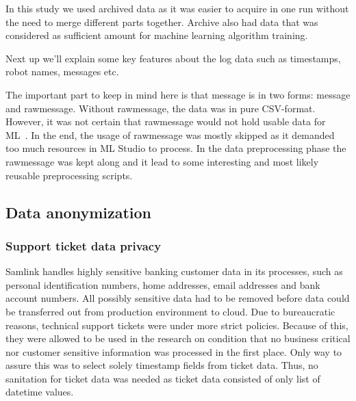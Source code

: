 In this study we used archived data
as it was easier to acquire in one run
without the need to merge different parts together.
Archive also had
data that was considered as sufficient amount
for machine learning algorithm training.

\begin{itcomment} %
    Next up we'll explain some key features about the log data
    such as timestamps, robot names, messages etc.

    The important part to keep in mind here is that message is in two forms:
    message and rawmessage.
    Without rawmessage, the data was in pure CSV-format.
    However, it was not certain that rawmessage would not hold usable data for ML~.
    In the end, the usage of rawmessage was mostly skipped
    as it demanded too much resources in ML Studio to process.
    In the data preprocessing phase the rawmessage was kept along
    and it lead to some interesting and most likely reusable preprocessing scripts.
\end{itcomment}


\subsection{Data anonymization}\label{subsec:meth-data-anonymization}

\subsubsection*{Support ticket data privacy}
Samlink handles highly sensitive banking customer data in its processes,
such as personal identification numbers, home addresses, email addresses and bank account numbers.
All possibly sensitive data had to be removed
before data could be transferred out from production environment to cloud.
Due to bureaucratic reasons,
technical support tickets were under more strict policies.
Because of this,
they were allowed to be used in the research
on condition that no business critical nor customer sensitive information
was processed in the first place.
Only way to assure this
was to select solely timestamp fields from ticket data.
Thus, no sanitation for ticket data was needed
as ticket data consisted of only list of datetime values.


